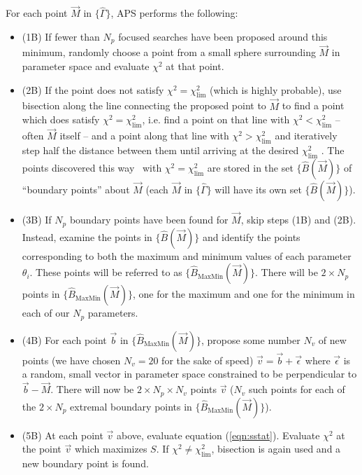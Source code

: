 \documentclass[useAMS,usenatbib]{aastex}
\begin{document}
For each point $\vec{M}$ in $\{\hat{\Gamma}\}$, APS performs the following:
\begin{itemize}
\item (1B) If fewer than $N_p$ focused searches have been proposed around this minimum, 
randomly choose a point from a small sphere surrounding $\vec{M}$ in parameter space and 
evaluate $\chi^2$ at that point.  
\\
\item(2B) If the point does not satisfy $\chi^2=\chi^2_\text{lim}$ (which is highly probable), 
use bisection
along the line connecting the proposed point to $\vec{M}$ to find a point which does
satisfy $\chi^2=\chi^2_\text{lim}$, i.e. find a point on that line with
$\chi^2<\chi^2_\text{lim}$ -- often $\vec{M}$ itself -- and a point along that line
with $\chi^2>\chi^2_\text{lim}$ and iteratively step half the distance between them until
arriving at the desired $\chi^2_\text{lim}$ \cite{minuit}.  The points discovered this way \
with $\chi^2=\chi^2_\text{lim}$ are stored in the set $\{\hat{B}(\vec{M})\}$ of 
``boundary points'' about $\vec{M}$ (each $\vec{M}$ in $\{\hat{\Gamma}\}$ will have its own
set $\{\hat{B}(\vec{M})\}$).  
\\
\item(3B) If $N_p$ boundary points have been found for $\vec{M}$, skip steps (1B) and (2B).
Instead, examine the points in $\{\hat{B}(\vec{M})\}$ and identify the points
corresponding to both the maximum and minimum values of each parameter $\theta_i$.  These
points will be referred to as $\{\hat{B}_\text{MaxMin}(\vec{M})\}$.  
There will be $2\times N_p$ points in $\{\hat{B}_\text{MaxMin}(\vec{M})\}$, one for
the maximum and one for the minimum in each of our $N_p$ parameters.  
\\
\item(4B) For each point $\vec{b}$ in $\{\hat{B}_\text{MaxMin}(\vec{M})\}$, 
propose some number $N_v$ of new points (we have chosen
$N_v=20$ for the sake of speed) $\vec{v} = \vec{b}+\vec{\epsilon}$ where $\vec{\epsilon}$ is a
random, small vector in parameter space constrained to be perpendicular to
$\vec{b}-\vec{M}$.  There will now be $2\times N_p \times N_v$ points $\vec{v}$
($N_v$ such points for each of the $2\times N_p$ extremal boundary points in
$\{\hat{B}_\text{MaxMin}(\vec{M})\}$).
\\
\item(5B) At each point $\vec{v}$ above, evaluate equation (\ref{eqn:sstat}).  
Evaluate $\chi^2$ at the point $\vec{v}$ which maximizes $S$. If
$\chi^2 \neq \chi^2_\text{lim}$, bisection is again used and a new boundary point is found.
\end{itemize}
\end{document}
